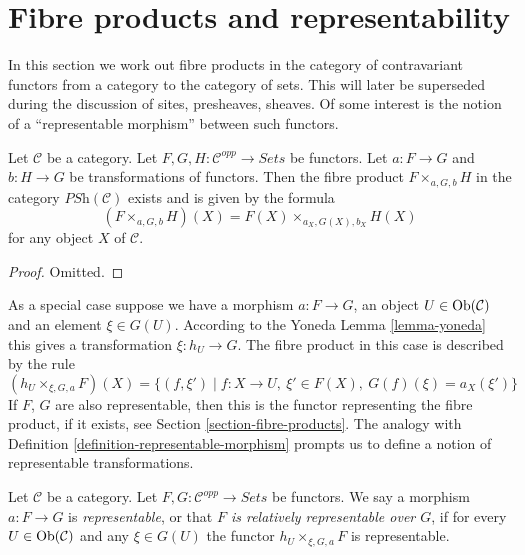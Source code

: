 \section{Fibre products and representability}
\label{section-representable-map-presheaves}

\noindent
In this section we work out fibre products in the
category of contravariant functors from a category
to the category of sets. This will later be superseded
during the discussion of sites, presheaves, sheaves. Of some
interest is the notion of a ``representable morphism'' between
such functors.

\begin{lemma}
\label{lemma-fibre-product-presheaves}
Let $\mathcal{C}$ be a category.
Let $F, G, H : \mathcal{C}^{opp} \to \textit{Sets}$
be functors. Let $a : F \to G$ and $b : H \to G$ be
transformations of functors. Then the fibre product
$F \times_{a, G, b} H$ in the category
$\textit{PSh}(\mathcal{C})$
exists and is given by the formula
$$
(F \times_{a, G, b} H)(X) =
F(X) \times_{a_X, G(X), b_X} H(X)
$$
for any object $X$ of $\mathcal{C}$.
\end{lemma}

\begin{proof}
Omitted.
\end{proof}

\noindent
As a special case suppose we have a morphism
$a : F \to G$, an object $U \in \mathop{\mathrm{Ob}}\nolimits(\mathcal{C})$
and an element $\xi \in G(U)$. According to the Yoneda
Lemma \ref{lemma-yoneda} this gives a transformation
$\xi : h_U \to G$. The fibre product in this case
is described by the rule
$$
(h_U \times_{\xi, G, a} F)(X) =
\{ (f, \xi') \mid f : X \to U, \ \xi' \in F(X), \ G(f)(\xi) = a_X(\xi')\}
$$
If $F$, $G$ are also representable, then this is the functor representing the
fibre product, if it exists, see Section \ref{section-fibre-products}.
The analogy with Definition \ref{definition-representable-morphism}
prompts us to define a notion
of representable transformations.

\begin{definition}
\label{definition-representable-map-presheaves}
Let $\mathcal{C}$ be a category.
Let $F, G : \mathcal{C}^{opp} \to \textit{Sets}$
be functors. We say a morphism $a : F \to G$ is
{\it representable}, or that {\it $F$ is relatively representable
over $G$}, if for every $U \in \mathop{\mathrm{Ob}}\nolimits(\mathcal{C})$
and any $\xi \in G(U)$ the functor
$h_U \times_{\xi, G, a} F$ is representable.
\end{definition}

